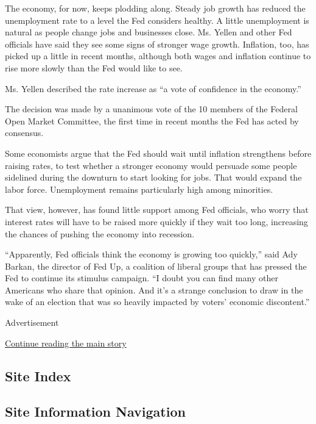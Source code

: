The economy, for now, keeps plodding along. Steady job growth has
reduced the unemployment rate to a level the Fed considers healthy. A
little unemployment is natural as people change jobs and businesses
close. Ms. Yellen and other Fed officials have said they see some signs
of stronger wage growth. Inflation, too, has picked up a little in
recent months, although both wages and inflation continue to rise more
slowly than the Fed would like to see.

Ms. Yellen described the rate increase as ``a vote of confidence in the
economy.''

The decision was made by a unanimous vote of the 10 members of the
Federal Open Market Committee, the first time in recent months the Fed
has acted by consensus.

Some economists argue that the Fed should wait until inflation
strengthens before raising rates, to test whether a stronger economy
would persuade some people sidelined during the downturn to start
looking for jobs. That would expand the labor force. Unemployment
remains particularly high among minorities.

That view, however, has found little support among Fed officials, who
worry that interest rates will have to be raised more quickly if they
wait too long, increasing the chances of pushing the economy into
recession.

``Apparently, Fed officials think the economy is growing too quickly,''
said Ady Barkan, the director of Fed Up, a coalition of liberal groups
that has pressed the Fed to continue its stimulus campaign. ``I doubt
you can find many other Americans who share that opinion. And it's a
strange conclusion to draw in the wake of an election that was so
heavily impacted by voters' economic discontent.''

Advertisement

\protect\hyperlink{after-bottom}{Continue reading the main story}

\hypertarget{site-index}{%
\subsection{Site Index}\label{site-index}}

\hypertarget{site-information-navigation}{%
\subsection{Site Information
Navigation}\label{site-information-navigation}}

